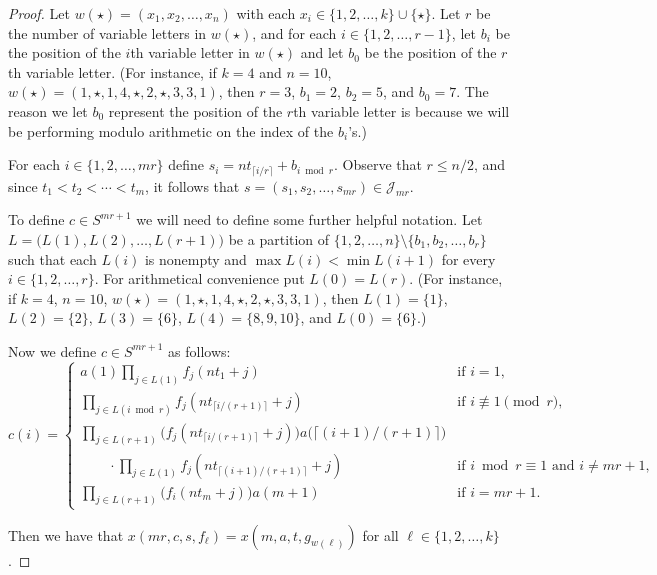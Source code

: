 \documentclass[12pt]{article}
\theoremstyle{plain}
\theoremstyle{definition}
\newcommand{\calJ}{\mathcal{J}}
\begin{document}
\begin{proof}
  Let $w(\star) = (x_1, x_2, \ldots, x_n)$ with each $x_i \in \{1, 2, \ldots, k\} \cup \{\star\}$. 
  Let $r$ be the number of variable letters in $w(\star)$, and for each $i \in \{1, 2, \ldots, r-1\}$, let $b_i$ be the position of the \mbox{$i$th} variable letter in $w(\star)$ and let $b_0$ be the position of the \mbox{$r$th} variable letter.
  (For instance, if $k = 4$ and $n = 10$, $w(\star) = (1, \star, 1, 4, \star, 2, \star, 3, 3, 1)$, then $r = 3$, $b_1 = 2$, $b_2 = 5$, and $b_0 = 7$.
  The reason we let $b_0$ represent the position of the \mbox{$r$th} variable letter is because we will be performing modulo arithmetic on the index of the $b_i$'s.)

  For each $i \in \{1, 2, \ldots, mr\}$ define $s_i = nt_{\lceil i/r \rceil} + b_{i \bmod r}$.
  Observe that $r \le n/2$, and since $t_1 < t_2 < \cdots < t_m$, it follows that $s = (s_1, s_2, \ldots, s_{mr}) \in \calJ_{mr}$.

  To define $c \in S^{mr+1}$ we will need to define some further helpful notation. 
  Let $L = \bigl( L(1), L(2), \ldots, L(r+1) \bigr)$ be a partition of $\{1, 2, \ldots, n\} \setminus \{b_1, b_2, \ldots, b_r\}$ such that each $L(i)$ is nonempty and $\max L(i) < \min L(i+1)$ for every $i \in \{1, 2, \ldots, r\}$. 
  For arithmetical convenience put $L(0) = L(r)$. 
  (For instance, if $k = 4$, $n = 10$, $w(\star) = (1, \star, 1, 4, \star, 2, \star, 3, 3, 1)$, then $L(1) = \{1\}$, $L(2) = \{2\}$, $L(3) = \{6\}$, $L(4) = \{8, 9, 10\}$, and $L(0) = \{6\}$.)

  Now we define $c \in S^{mr+1}$ as follows:
  \[
    c(i) = 
    \begin{cases}
      a(1)\prod_{j \in L(1)} f_j(nt_1 + j) & \mbox{if $i = 1$,} \\
      \prod_{j \in L(i \bmod r)}  f_j(nt_{\lceil i/(r+1) \rceil} + j) & \mbox{if $i \not\equiv 1 \pmod r$, }\\
      \prod_{j \in L(r+1)} \bigl( f_j(nt_{\lceil i/(r+1) \rceil} + j) \bigr) a\bigl( \lceil (i+1)/(r+1) \rceil \bigr) & \\
      \hspace{2em} \cdot\prod_{j \in L(1)} f_j(nt_{\lceil (i+1)/(r+1) \rceil} + j) & \mbox{if $i \bmod r \equiv 1$ and $i \ne mr +1$, }\\
      \prod_{j \in L(r+1)} \bigr( f_i(nt_m + j) \bigr) a(m+1) & \mbox{if $i = mr + 1$.}
    \end{cases}
  \]

  Then we have that $x(mr, c, s, f_\ell) = x(m, a, t, g_{w(\ell)})$ for all $\ell \in \{1, 2, \ldots, k\}$.
\end{proof}
\end{document}
